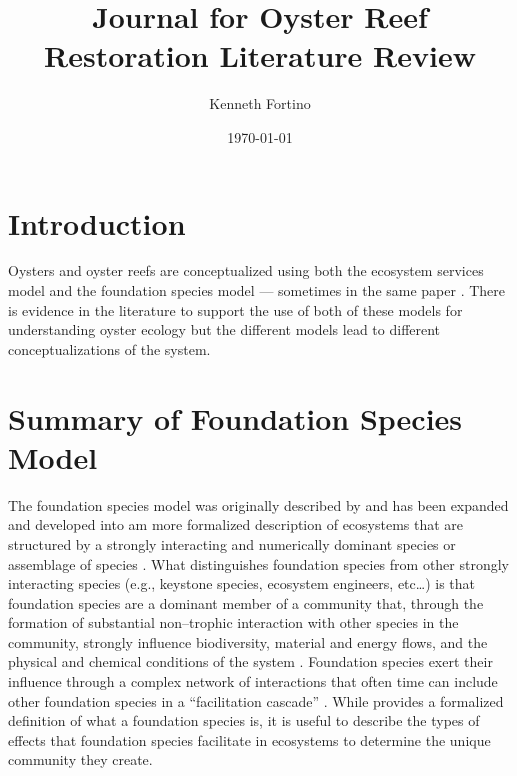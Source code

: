\documentclass{article}
\begin{document}
\title{Journal for Oyster Reef Restoration Literature Review}
\author{Kenneth Fortino}
\date{\today}

\maketitle

\section{Introduction}

Oysters and oyster reefs are conceptualized using both the ecosystem services model and the foundation species model --- sometimes in the same paper \cite{mercaldo-allen_oyster_2023}. There is evidence in the literature to support the use of both of these models for understanding oyster ecology but the different models lead to different conceptualizations of the system. 

\section{Summary of Foundation Species Model}

The foundation species model was originally described by  and has been expanded and developed into am more formalized description of ecosystems that are structured by a strongly interacting and numerically dominant species or assemblage of species \cite{ellison_foundation_2019}. What distinguishes foundation species from other strongly interacting species (e.g., keystone species, ecosystem engineers, etc\ldots) is that foundation species are a dominant member of a community that, through the formation of substantial non--trophic interaction with other species in the community, strongly influence biodiversity, material and energy flows, and the physical and chemical conditions of the system \cite{ellison_foundation_2019}. Foundation species exert their influence through a complex network of interactions that often time can include other foundation species in a ``facilitation cascade'' \cite{angelini_interactions_2011, ellison_foundation_2019, vozzo_cooccuring_2019}. While  provides a formalized definition of what a foundation species is, it is useful to describe the types of effects that foundation species facilitate in ecosystems to determine the unique community they create. 
\end{document}
